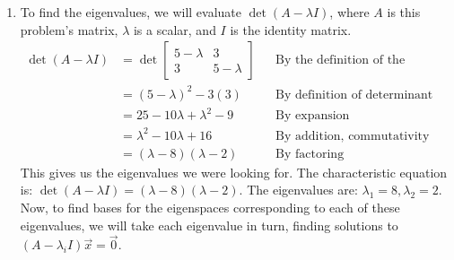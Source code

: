 \documentclass[10pt,letterpaper,final]{report}
\newcommand{\reason}[1]{&& \text{#1}}
\begin{document}
\begin{enumerate}[label=(\alph*)]
  \item To find the eigenvalues, we will evaluate $\det (A - \lambda I)$, where $A$ is this problem's matrix, $\lambda$ is a scalar, and $I$ is the identity matrix.
        \begin{align*}
          \det (A - \lambda I) & = \det \begin{bmatrix}
                                          5 - \lambda & 3           \\
                                          3           & 5 - \lambda
                                        \end{bmatrix} \reason{By the definition of the characteristic equation} \\[1ex]
                               & = (5-\lambda)^2 - 3(3) \reason{By definition of determinant}                   \\[1ex]
                               & = 25 - 10\lambda + \lambda^2 - 9 \reason{By expansion}                         \\[1ex]
                               & = \lambda^2 - 10\lambda + 16 \reason{By addition, commutativity}               \\[1ex]
                               & = (\lambda - 8)(\lambda - 2) \reason{By factoring}
        \end{align*}
        This gives us the eigenvalues we were looking for.
        The characteristic equation is: $\det(A-\lambda I) = (\lambda - 8)(\lambda - 2)$. The eigenvalues are: $\lambda_1 = 8, \lambda_2 = 2$.
        Now, to find bases for the eigenspaces corresponding to each of these eigenvalues, we will take each eigenvalue in turn, finding solutions to $(A-\lambda_i I)\vec{x} = \vec{0}$.


\end{enumerate}
\end{document}
